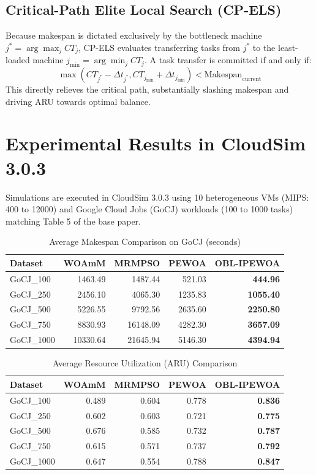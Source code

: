 \documentclass[journal]{IEEEtran}
\begin{document}
\subsection{Critical-Path Elite Local Search (CP-ELS)}
Because makespan is dictated exclusively by the bottleneck machine $j^* = \arg\max_j CT_j$, CP-ELS evaluates transferring tasks from $j^*$ to the least-loaded machine $j_{\min} = \arg\min_j CT_j$. A task transfer is committed if and only if:
\begin{equation}
\max(CT_{j^*} - \Delta t_{j^*}, CT_{j_{\min}} + \Delta t_{j_{\min}}) < \text{Makespan}_{\text{current}}
\end{equation}
This directly relieves the critical path, substantially slashing makespan and driving ARU towards optimal balance.

\section{Experimental Results in CloudSim 3.0.3}
Simulations are executed in CloudSim 3.0.3 using 10 heterogeneous VMs (MIPS: 400 to 12000) and Google Cloud Jobs (GoCJ) workloads (100 to 1000 tasks) matching Table 5 of the base paper.

\begin{table}[htbp]
\caption{Average Makespan Comparison on GoCJ (seconds)}
\label{tab:makespan}
\centering
\begin{tabular}{lrrrr}
\toprule
Dataset & WOAmM & MRMPSO & PEWOA & \textbf{OBL-IPEWOA} \\
\midrule
GoCJ\_100  & 1463.49 & 1487.44 & 521.03  & \textbf{444.96} \\
GoCJ\_250  & 2456.10 & 4065.30 & 1235.83 & \textbf{1055.40} \\
GoCJ\_500  & 5226.55 & 9792.56 & 2635.60 & \textbf{2250.80} \\
GoCJ\_750  & 8830.93 & 16148.09& 4282.30 & \textbf{3657.09} \\
GoCJ\_1000 & 10330.64& 21645.94& 5146.30 & \textbf{4394.94} \\
\bottomrule
\end{tabular}
\end{table}

\begin{table}[htbp]
\caption{Average Resource Utilization (ARU) Comparison}
\label{tab:aru}
\centering
\begin{tabular}{lrrrr}
\toprule
Dataset & WOAmM & MRMPSO & PEWOA & \textbf{OBL-IPEWOA} \\
\midrule
GoCJ\_100  & 0.489 & 0.604 & 0.778 & \textbf{0.836} \\
GoCJ\_250  & 0.602 & 0.603 & 0.721 & \textbf{0.775} \\
GoCJ\_500  & 0.676 & 0.585 & 0.732 & \textbf{0.787} \\
GoCJ\_750  & 0.615 & 0.571 & 0.737 & \textbf{0.792} \\
GoCJ\_1000 & 0.647 & 0.554 & 0.788 & \textbf{0.847} \\
\bottomrule
\end{tabular}
\end{table}
\end{document}
